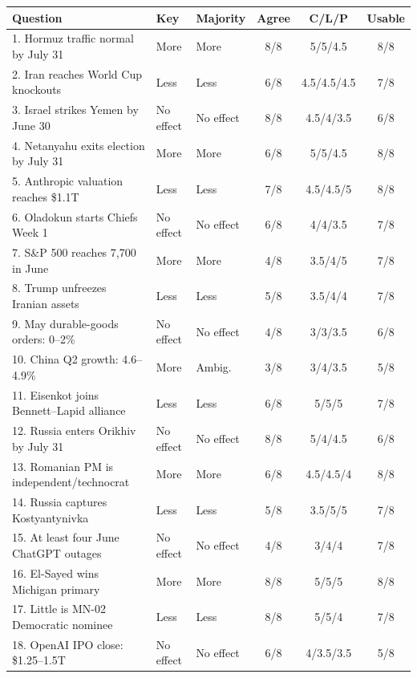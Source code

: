 \begin{tabular}{@{}p{.40\linewidth}llccc@{}}
\toprule
Question & Key & Majority & Agree & C/L/P & Usable \\
\midrule
1. Hormuz traffic normal by July 31 & More & More & 8/8 & 5/5/4.5 & 8/8 \\
2. Iran reaches World Cup knockouts & Less & Less & 6/8 & 4.5/4.5/4.5 & 7/8 \\
3. Israel strikes Yemen by June 30 & No effect & No effect & 8/8 & 4.5/4/3.5 & 6/8 \\
4. Netanyahu exits election by July 31 & More & More & 6/8 & 5/5/4.5 & 8/8 \\
5. Anthropic valuation reaches \$1.1T & Less & Less & 7/8 & 4.5/4.5/5 & 8/8 \\
6. Oladokun starts Chiefs Week 1 & No effect & No effect & 6/8 & 4/4/3.5 & 7/8 \\
7. S\&P 500 reaches 7,700 in June & More & More & 4/8 & 3.5/4/5 & 7/8 \\
8. Trump unfreezes Iranian assets & Less & Less & 5/8 & 3.5/4/4 & 7/8 \\
9. May durable-goods orders: 0--2\% & No effect & No effect & 4/8 & 3/3/3.5 & 6/8 \\
10. China Q2 growth: 4.6--4.9\% & More & Ambig. & 3/8 & 3/4/3.5 & 5/8 \\
11. Eisenkot joins Bennett--Lapid alliance & Less & Less & 6/8 & 5/5/5 & 7/8 \\
12. Russia enters Orikhiv by July 31 & No effect & No effect & 8/8 & 5/4/4.5 & 6/8 \\
13. Romanian PM is independent/technocrat & More & More & 6/8 & 4.5/4.5/4 & 8/8 \\
14. Russia captures Kostyantynivka & Less & Less & 5/8 & 3.5/5/5 & 7/8 \\
15. At least four June ChatGPT outages & No effect & No effect & 4/8 & 3/4/4 & 7/8 \\
16. El-Sayed wins Michigan primary & More & More & 8/8 & 5/5/5 & 8/8 \\
17. Little is MN-02 Democratic nominee & Less & Less & 8/8 & 5/5/4 & 7/8 \\
18. OpenAI IPO close: \$1.25--1.5T & No effect & No effect & 6/8 & 4/3.5/3.5 & 5/8 \\
\bottomrule
\end{tabular}
